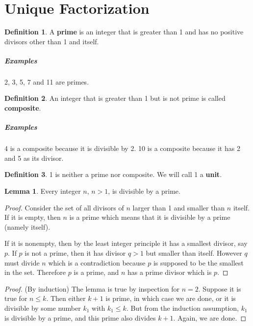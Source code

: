 \documentclass{article}
\theoremstyle{definition} %
\theoremstyle{definition}
\theoremstyle{definition}
\newtheorem{lemma}{Lemma}[section]
\theoremstyle{definition}
\newtheorem{definition}{Definition}[section]
\begin{document}
  \section{Unique Factorization}
  
  \begin{definition}
    A \textbf{prime} is an integer that is greater than 1 and has no positive divisors other than 1 and itself.
  \end{definition}
  
  \subparagraph{Examples} 2, 3, 5, 7 and 11 are primes.
  
  \begin{definition}
    An integer that is greater than 1 but is not prime is called \textbf{composite}.
  \end{definition}
  
  \subparagraph{Examples} 4 is a composite because it is divisible by 2. 10 is a composite because it
  has 2 and 5 as its divisor.
  
  \begin{definition}
    1 is neither a prime nor composite. We will call 1 a \textbf{unit}.
  \end{definition}
  
  \begin{lemma}
    Every integer $n$, $n > 1$, is divisible by a prime.
    \label{lem:n_is_divisible_by_prime}
  \end{lemma}
  
  \begin{proof}
    Consider the set of all divisors of $n$ larger than 1 and smaller than $n$ itself. If it is empty,
    then $n$ is a prime which means that it is divisible by a prime (namely itself).
    
    If it is nonempty, then by the least integer principle it has a smallest divisor, say $p$. If $p$
    is not a prime, then it has divisor $q > 1$ but smaller than itself. However $q$ must divide
    $n$ which is a contradiction because $p$ is supposed to be the smallest in the set. Therefore
    $p$ is a prime, and $n$ has a prime divisor which is $p$.
  \end{proof}
  
  \begin{proof}
    (By induction) The lemma is true by inspection for $n = 2$. Suppose it is true for $n \leq k$. Then either
    $k + 1$ is prime, in which case we are done, or it is divisible by some number $k_1$ with
    $k_1 \leq k$. But from the induction assumption, $k_1$ is divisible by a prime, and this prime
    also divides $k + 1$. Again, we are done.
  \end{proof}
  
\end{document}
